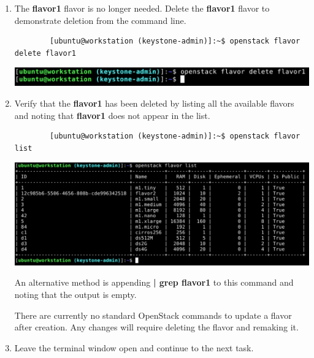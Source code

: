\documentclass[letterpaper, 12pt]{article}
\begin{document}
\begin{enumerate}
    \item The \textbf{flavor1} flavor is no longer needed. Delete the \textbf{flavor1} flavor to demonstrate deletion
    from the command line.
    \begin{lstlisting}
        [ubuntu@workstation (keystone-admin)]:~$ openstack flavor delete flavor1
    \end{lstlisting}

    \begin{center}
        \includegraphics[width=\linewidth]{images/part2/step11.png}
    \end{center}

    \item Verify that the \textbf{flavor1} has been deleted by listing all the available flavors and noting that
    \textbf{flavor1} does not appear in the list.
    \begin{lstlisting}
        [ubuntu@workstation (keystone-admin)]:~$ openstack flavor list    
    \end{lstlisting}

    \begin{center}
        \includegraphics[width=\linewidth]{images/part2/step12.png}
    \end{center}

    \begin{tipbox}
        An alternative method is appending \textbf{| grep flavor1} to this command and noting that the output is empty.
    \end{tipbox}

    \begin{notebox}
        There are currently no standard OpenStack commands to update a flavor after creation. Any changes will require
        deleting the flavor and remaking it.
    \end{notebox}

    \item Leave the terminal window open and continue to the next task.
\end{enumerate}
\end{document}
